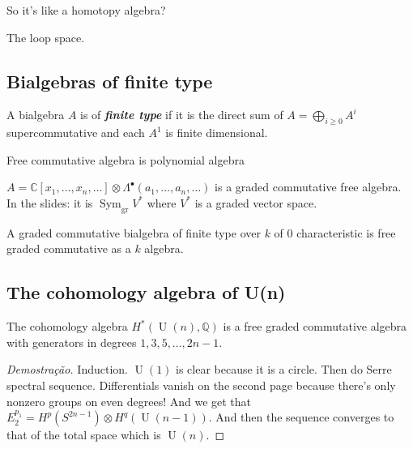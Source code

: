 So it's like a homotopy algebra?

\begin{example}
	The loop space.
\end{example}

\subsection{Bialgebras of finite type}

\begin{defn}
	A bialgebra $A$ is of \textit{\textbf{finite type}} if it is the direct sum of $A=\bigoplus_{i\geq 0} A^i $ supercommutative and each $A^1$ is finite dimensional.
\end{defn}

\begin{remark}
	Free commutative algebra is polynomial algebra
\end{remark}

\begin{defn}
	$A=\mathbb{C}[x_1,\ldots,x_n,\ldots]\otimes \Lambda^\bullet(a_1,\ldots,a_n,\ldots)$ is a graded commutative free algebra. In the slides: it is $\operatorname{Sym}_{\operatorname{gr}}V^*$ where $V^*$ is a graded vector space.
\end{defn}

\begin{thm}[Hopf]\leavevmode
	A graded commutative bialgebra of finite type over $k$ of 0 characteristic is free graded commutative as a $k$ algebra.
\end{thm}

\subsection{The cohomology algebra of U(n)}

\begin{claim}
	The cohomology algebra $H^{*}(\operatorname{U}(n),\mathbb{Q})$ is a free graded commutative algebra with generators in degrees $1,3,5,\ldots,2n-1$.
\end{claim}

\begin{proof}[Demostra\c c\~ao]
	Induction.  $\operatorname{U}(1)$ is clear because it is a circle. Then do Serre spectral sequence. Differentials vanish on the second page because there's only nonzero groups on even degrees! And we get that $E_2^{p_1}=H^{p}(S^{2n-1})\otimes H^{q}(\operatorname{U}(n-1))$. And then the sequence converges to that of the total space which is $\operatorname{U}(n)$.
\end{proof}

